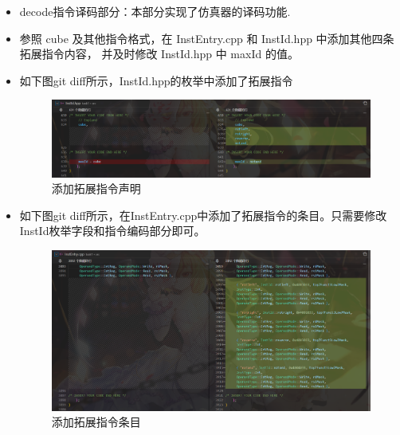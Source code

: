 \documentclass[12pt,hyperref,a4paper,UTF8]{ctexart}
\begin{document}
\begin{itemize}
    \item decode指令译码部分：本部分实现了仿真器的译码功能.
    \item 参照 cube 及其他指令格式，在 InstEntry.cpp 和 InstId.hpp 中添加其他四条拓展指令内容，
并及时修改 InstId.hpp 中 maxId 的值。
    \item 如下图git diff所示，InstId.hpp的枚举中添加了拓展指令
  \begin{figure}[H]
      \centering
      \includegraphics[width =1.0\textwidth]{figures/fig/image3.png}
      \caption{添加拓展指令声明}
  \end{figure}
      \item 如下图git diff所示，在InstEntry.cpp中添加了拓展指令的条目。只需要修改InstId枚举字段和指令编码部分即可。
  \begin{figure}[H]
      \centering
      \includegraphics[width =1.0\textwidth]{figures/fig/image4.png}
      \caption{添加拓展指令条目}
  \end{figure}



\end{itemize}
\end{document}
